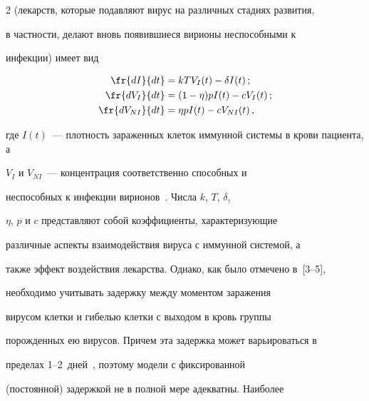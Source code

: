 \begin{multicols}{2}
(лекарств, которые подавляют вирус на различных стадиях развития,


в частности, делают вновь появившиеся вирионы неспособными к


инфекции) имеет вид 





\vspace*{-8pt}


\noindent


\begin{align} 


\fr{dI}{dt}&=kTV_I(t)-\delta I(t)\,;  \notag\\


\fr{dV_I}{dt}&=(1-\eta)pI(t)-c V_I(t)\,;\label{1us}\\ 


\fr{dV_{NI}}{dt}&=\eta pI(t)-cV_{NI}(t)\,,\notag


\end{align} 


                                                                                                                                                                                                             





\noindent


где $I(t)$~--- плотность зараженных клеток иммунной системы в крови пациента, а


$V_I$ и $V_{NI}$~--- концентрация соответственно способных и


неспособных к инфекции вирионов~\cite{2us}. Числа $k$, $T$, $\delta$,


$\eta$, $p$ и $c$ представляют собой коэффициенты, характеризующие


различные аспекты взаимодействия вируса с иммунной системой, а


также эффект воздействия лекарства. Однако, как было отмечено в~[3--5], 


необходимо учитывать задержку между моментом заражения


вирусом клетки и гибелью клетки с выходом в кровь группы


порожденных ею вирусов. Причем эта задержка может варьироваться в


пределах 1--2~дней~\cite{4us}, поэтому модели с фиксированной


(постоянной) задержкой не в полной мере адекватны. Наиболее



\end{multicols}
